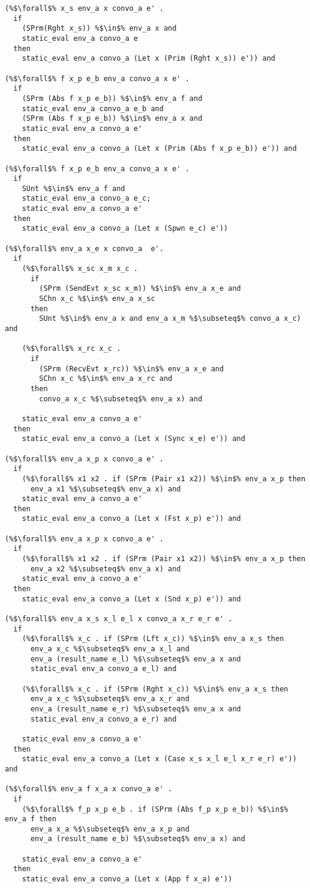\documentclass{article}
\begin{document}
\begin{lstlisting}[language=logic, style=codestyle1, escapechar=\%]
(%$\forall$% x_s env_a x convo_a e' .
  if
    (SPrm(Rght x_s)) %$\in$% env_a x and
    static_eval env_a convo_a e
  then
    static_eval env_a convo_a (Let x (Prim (Rght x_s)) e')) and

(%$\forall$% f x_p e_b env_a convo_a x e' .
  if
    (SPrm (Abs f x_p e_b)) %$\in$% env_a f and
    static_eval env_a convo_a e_b and
    (SPrm (Abs f x_p e_b)) %$\in$% env_a x and
    static_eval env_a convo_a e'
  then
    static_eval env_a convo_a (Let x (Prim (Abs f x_p e_b)) e')) and

(%$\forall$% f x_p e_b env_a convo_a x e' .
  if
    SUnt %$\in$% env_a f and
    static_eval env_a convo_a e_c;
    static_eval env_a convo_a e'
  then
    static_eval env_a convo_a (Let x (Spwn e_c) e'))

(%$\forall$% env_a x_e x convo_a  e'.
  if
    (%$\forall$% x_sc x_m x_c . 
      if
        (SPrm (SendEvt x_sc x_m)) %$\in$% env_a x_e and 
        SChn x_c %$\in$% env_a x_sc 
      then
        SUnt %$\in$% env_a x and env_a x_m %$\subseteq$% convo_a x_c) and

    (%$\forall$% x_rc x_c . 
      if
        (SPrm (RecvEvt x_rc)) %$\in$% env_a x_e and 
        SChn x_c %$\in$% env_a x_rc and 
      then
        convo_a x_c %$\subseteq$% env_a x) and

    static_eval env_a convo_a e'
  then
    static_eval env_a convo_a (Let x (Sync x_e) e')) and

(%$\forall$% env_a x_p x convo_a e' . 
  if
    (%$\forall$% x1 x2 . if (SPrm (Pair x1 x2)) %$\in$% env_a x_p then
      env_a x1 %$\subseteq$% env_a x) and
    static_eval env_a convo_a e'
  then
    static_eval env_a convo_a (Let x (Fst x_p) e')) and

(%$\forall$% env_a x_p x convo_a e' . 
  if
    (%$\forall$% x1 x2 . if (SPrm (Pair x1 x2)) %$\in$% env_a x_p then
      env_a x2 %$\subseteq$% env_a x) and
    static_eval env_a convo_a e'
  then
    static_eval env_a convo_a (Let x (Snd x_p) e')) and

(%$\forall$% env_a x_s x_l e_l x convo_a x_r e_r e' . 
  if
    (%$\forall$% x_c . if (SPrm (Lft x_c)) %$\in$% env_a x_s then 
      env_a x_c %$\subseteq$% env_a x_l and
      env_a (result_name e_l) %$\subseteq$% env_a x and
      static_eval env_a convo_a e_l) and

    (%$\forall$% x_c . if (SPrm (Rght x_c)) %$\in$% env_a x_s then 
      env_a x_c %$\subseteq$% env_a x_r and
      env_a (result_name e_r) %$\subseteq$% env_a x and
      static_eval env_a convo_a e_r) and

    static_eval env_a convo_a e'
  then
    static_eval env_a convo_a (Let x (Case x_s x_l e_l x_r e_r) e')) and

(%$\forall$% env_a f x_a x convo_a e' . 
  if
    (%$\forall$% f_p x_p e_b . if (SPrm (Abs f_p x_p e_b)) %$\in$% env_a f then 
      env_a x_a %$\subseteq$% env_a x_p and 
      env_a (result_name e_b) %$\subseteq$% env_a x) and

    static_eval env_a convo_a e'
  then
    static_eval env_a convo_a (Let x (App f x_a) e'))

\end{lstlisting}
\end{document}
